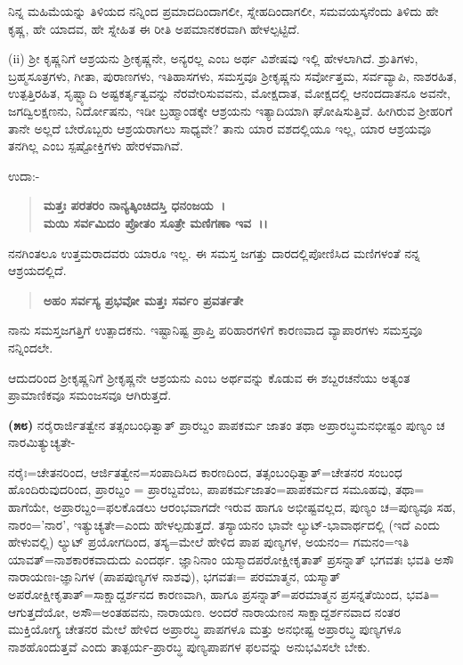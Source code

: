 
ನಿನ್ನ ಮಹಿಮೆಯನ್ನು ತಿಳಿಯದ ನನ್ನಿಂದ ಪ್ರಮಾದದಿಂದಾಗಲೀ, ಸ್ನೇಹದಿಂದಾಗಲೀ, ಸಮವಯಸ್ಕನೆಂದು ತಿಳಿದು ಹೇ ಕೃಷ್ಣ, ಹೇ ಯಾದವ, ಹೇ ಸ್ನೇಹಿತ ಈ ರೀತಿ ಅಪಮಾನಕರವಾಗಿ ಹೇಳಲ್ಪಟ್ಟಿದೆ.

(ii) ಶ‍್ರೀ ಕೃಷ್ಣನಿಗೆ ಆಶ್ರಯನು ಶ‍್ರೀಕೃಷ್ಣನೇ, ಅನ್ಯರಲ್ಲ ಎಂಬ ಅರ್ಥ ವಿಶೇಷವು ಇಲ್ಲಿ ಹೇಳಲಾಗಿದೆ. ಶ್ರುತಿಗಳು, ಬ್ರಹ್ಮಸೂತ್ರಗಳು, ಗೀತಾ, ಪುರಾಣಗಳು, ಇತಿಹಾಸಗಳು, ಸಮಸ್ತವೂ ಶ‍್ರೀಕೃಷ್ಣನು ಸರ್ವೋತ್ತಮ, ಸರ್ವವ್ಯಾಪಿ, ನಾಶರಹಿತ, ಉತ್ಪತ್ತಿರಹಿತ, ಸೃಷ್ಟ್ಯಾದಿ ಅಷ್ಟಕರ್ತೃತ್ವವನ್ನು ನೆರವೇರಿಸುವವನು, ಮೋಕ್ಷದಾತ, ಮೋಕ್ಷದಲ್ಲಿ ಆನಂದದಾತನೂ ಅವನೇ, ಜಗದ್ವಿಲಕ್ಷಣನು, ನಿರ್ದೋಷನು, ಇಡೀ ಬ್ರಹ್ಮಾಂಡಕ್ಕೇ ಆಶ್ರಯನು ಇತ್ಯಾದಿಯಾಗಿ ಘೋಷಿಸುತ್ತಿವೆ. ಹೀಗಿರುವ ಶ‍್ರೀಹರಿಗೆ ತಾನೇ ಅಲ್ಲದೆ ಬೇರೊಬ್ಬರು ಆಶ್ರಯರಾಗಲು ಸಾಧ್ಯವೇ? ತಾನು ಯಾರ ವಶದಲ್ಲಿಯೂ ಇಲ್ಲ, ಯಾರ ಆಶ್ರಯವೂ ತನಗಿಲ್ಲ ಎಂಬ ಸ್ಪಷ್ಟೋಕ್ತಿಗಳು ಹೇರಳವಾಗಿವೆ.

ಉದಾ:-

\begin{verse}
\textbf{ಮತ್ತಃ ಪರತರಂ ನಾನ್ಯತ್ಕಿಂಚಿದಸ್ತಿ ಧನಂಜಯ~।}\\\textbf{ಮಯಿ ಸರ್ವಮಿದಂ ಪ್ರೋತಂ ಸೂತ್ರೇ ಮಣಿಗಣಾ ಇವ~।।}
\end{verse}


ನನಗಿಂತಲೂ ಉತ್ತಮರಾದವರು ಯಾರೂ ಇಲ್ಲ. ಈ ಸಮಸ್ತ ಜಗತ್ತು ದಾರದಲ್ಲಿ\break ಪೋಣಿಸಿದ ಮಣಿಗಳಂತೆ ನನ್ನ ಆಶ್ರಯದಲ್ಲಿದೆ.

\begin{verse}
\textbf{ಅಹಂ ಸರ್ವಸ್ಯ ಪ್ರಭವೋ ಮತ್ತಃ ಸರ್ವಂ ಪ್ರವರ್ತತೇ}
\end{verse}


ನಾನು ಸಮಸ್ತಜಗತ್ತಿಗೆ ಉತ್ಪಾದಕನು. ಇಷ್ಟಾನಿಷ್ಟ ಪ್ರಾಪ್ತಿ ಪರಿಹಾರಗಳಿಗೆ ಕಾರಣವಾದ ವ್ಯಾಪಾರಗಳು ಸಮಸ್ತವೂ ನನ್ನಿಂದಲೇ.

ಆದುದರಿಂದ ಶ‍್ರೀಕೃಷ್ಣನಿಗೆ ಶ‍್ರೀಕೃಷ್ಣನೇ ಆಶ್ರಯನು ಎಂಬ ಅರ್ಥವನ್ನು ಕೊಡುವ ಈ ಶಬ್ದರಚನೆಯು ಅತ್ಯಂತ ಪ್ರಾಮಾಣಿಕವೂ ಸಮಂಜಸವೂ ಆಗಿರುತ್ತದೆ.

\textbf{(೫೮)} ನರೈರಾರ್ಜಿತತ್ವೇನ ತತ್ಸಂಬಂಧಿತ್ವಾತ್ ಪ್ರಾರಬ್ದಂ ಪಾಪಕರ್ಮ ಜಾತಂ ತಥಾ ಅಪ್ರಾರಬ್ಧಮನಭೀಷ್ಟಂ ಪುಣ್ಯಂ ಚ ನಾರಮಿತ್ಯುಚ್ಯತೇ-

ನರೈಃ=ಚೇತನರಿಂದ, ಆರ್ಜಿತತ್ವೇನ=ಸಂಪಾದಿಸಿದ ಕಾರಣದಿಂದ, ತತ್ಸಂಬಂಧಿತ್ವಾತ್=\break ಚೇತನರ ಸಂಬಂಧ ಹೊಂದಿರುವುದರಿಂದ, ಪ್ರಾರಬ್ದಂ = ಪ್ರಾರಬ್ದವೆಂಬ, ಪಾಪಕರ್ಮಜಾತಂ=ಪಾಪಕರ್ಮದ ಸಮೂಹವು, ತಥಾ= ಹಾಗೆಯೇ, ಅಪ್ರಾರಬ್ದಂ=ಫಲಕೊಡಲು ಆರಂಭವಾಗದೇ ಇರುವ ಹಾಗೂ ಅಭೀಷ್ಟವಲ್ಲದ, ಪುಣ್ಯಂ ಚ=ಪುಣ್ಯವೂ ಸಹ, ನಾರಂ=\break 'ನಾರ', ಇತ್ಯುಚ್ಯತೇ=ಎಂದು ಹೇಳಲ್ಪಡುತ್ತದೆ. ತಸ್ಯಾಯನಂ ಭಾವೇ ಲ್ಯುಟ್-ಭಾವಾರ್ಥದಲ್ಲಿ (ಇದೆ ಎಂದು ಹೇಳುವಲ್ಲಿ) ಲ್ಯುಟ್ ಪ್ರಯೋಗದಿಂದ, ತಸ್ಯ=ಮೇಲೆ ಹೇಳಿದ ಪಾಪ ಪುಣ್ಯಗಳ, ಅಯನಂ= ಗಮನಂ=ಇತಿ ಯಾವತ್=ನಾಶಕಾರಕವಾದುದು ಎಂದರ್ಥ. ಜ್ಞಾನಿನಾಂ ಯಸ್ಮಾದಪರೋಕ್ಷೀಕೃತಾತ್ ಪ್ರಸನ್ನಾತ್ ಭಗವತಃ ಭವತಿ ಅಸೌ ನಾರಾಯಣಃ-ಜ್ಞಾನಿಗಳ (ಪಾಪಪುಣ್ಯಗಳ ನಾಶವು), ಭಗವತಃ= ಪರಮಾತ್ಮನ, ಯಸ್ಮಾತ್ ಅಪರೋಕ್ಷೀ\-ಕೃತಾತ್=ಸಾಕ್ಷಾದ್ದರ್ಶನದ ಕಾರಣವಾಗಿ, ಹಾಗೂ ಪ್ರಸನ್ನಾತ್=ಪರಮಾತ್ಮನ ಪ್ರಸನ್ನತೆಯಿಂದ, ಭವತಿ= ಆಗುತ್ತದೆಯೋ, ಅಸೌ=ಅಂತಹವನು, ನಾರಾಯಣ. ಅಂದರೆ ನಾರಾಯಣನ ಸಾಕ್ಷಾದ್ದರ್ಶನವಾದ ನಂತರ ಮುಕ್ತಿಯೋಗ್ಯ ಚೇತನರ ಮೇಲೆ ಹೇಳಿದ ಅಪ್ರಾರಬ್ಧ ಪಾಪಗಳೂ ಮತ್ತು ಅನಭೀಷ್ಟ ಅಪ್ರಾರಬ್ಧ ಪುಣ್ಯಗಳೂ ನಾಶಹೊಂದುತ್ತವೆ ಎಂದು ತಾತ್ಪರ್ಯ-ಪ್ರಾರಬ್ಧ ಪುಣ್ಯಪಾಪಗಳ ಫಲವನ್ನು ಅನುಭವಿಸಲೇ ಬೇಕು.

